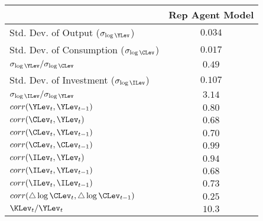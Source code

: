 \begin{center}
\begin{tabular}{l|c}
\hline
& Rep Agent Model \\ \hline
Std. Dev. of Output ($\sigma _{\log \YLev}$)                & $0.034$ \\
Std. Dev. of Consumption ($\sigma _{\log \CLev}$)           & $0.017$ \\
$\sigma _{\log \YLev}/\sigma _{\log \CLev}$                 & $0.49 $ \\
Std. Dev. of Investment ($\sigma _{\log \ILev}$)            & $0.107$ \\
$\sigma _{\log \ILev}/\sigma _{\log \YLev}$                 & $3.14 $ \\ \hline
$corr(\YLev_{t},\YLev_{t-1})$                               & $0.80$  \\
$corr(\CLev_{t},\YLev_{t})$                                 & $0.68$  \\
$corr(\CLev_{t},\YLev_{t-1})$                               & $0.70$  \\
$corr(\CLev_{t},\CLev_{t-1})$                               & $0.99$  \\
$corr(\ILev_{t},\YLev_{t})$                                 & $0.94$  \\
$corr(\ILev_{t},\YLev_{t-1})$                               & $0.68$  \\
$corr(\ILev_{t},\ILev_{t-1})$                               & $0.73$  \\ \hline
$corr(\triangle \log \CLev_{t},\triangle \log \CLev_{t-1})$ & $0.25$  \\ \hline
$\KLev_{t}/\YLev_{t}$                                       & $10.3$  \\ \hline
\end{tabular}
\end{center} 
